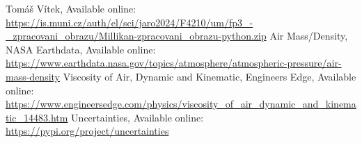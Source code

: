 \documentclass[a4paper,11pt]{article}
\begin{document}
    \begin{thebibliography}{9}
            Tomáš Vítek, Available online: \url{https://is.muni.cz/auth/el/sci/jaro2024/F4210/um/fp3_-_zpracovani_obrazu/Millikan-zpracovani_obrazu-python.zip}
            Air Mass/Density, NASA Earthdata, Available online: \url{https://www.earthdata.nasa.gov/topics/atmosphere/atmospheric-pressure/air-mass-density}
            Viscosity of Air, Dynamic and Kinematic, Engineers Edge, Available online: \url{https://www.engineersedge.com/physics/viscosity_of_air_dynamic_and_kinematic_14483.htm}
            Uncertainties, Available online: \url{https://pypi.org/project/uncertainties}
    \end{thebibliography}
        
\newpage
\end{document}
